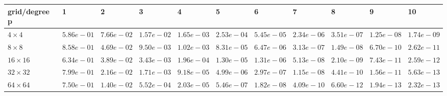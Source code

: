 \begin{tabular}{lllllllllll}
\hline
 grid/degree p   & 1          & 2          & 3          & 4          & 5          & 6          & 7          & 8          & 9          & 10         \\
\hline
 $4 \times 4$    & $5.86e-01$ & $7.66e-02$ & $1.57e-02$ & $1.65e-03$ & $2.53e-04$ & $5.45e-05$ & $2.34e-06$ & $3.51e-07$ & $1.25e-08$ & $1.74e-09$ \\
 $8 \times 8$    & $8.58e-01$ & $4.69e-02$ & $9.50e-03$ & $1.02e-03$ & $8.31e-05$ & $6.47e-06$ & $3.13e-07$ & $1.49e-08$ & $6.70e-10$ & $2.62e-11$ \\
 $16 \times 16$  & $6.34e-01$ & $3.89e-02$ & $3.43e-03$ & $1.96e-04$ & $1.30e-05$ & $1.31e-06$ & $5.13e-08$ & $2.10e-09$ & $7.43e-11$ & $2.59e-12$ \\
 $32 \times 32$  & $7.99e-01$ & $2.16e-02$ & $1.71e-03$ & $9.18e-05$ & $4.99e-06$ & $2.97e-07$ & $1.15e-08$ & $4.41e-10$ & $1.56e-11$ & $5.63e-13$ \\
 $64 \times 64$  & $7.50e-01$ & $1.40e-02$ & $5.52e-04$ & $2.03e-05$ & $5.46e-07$ & $1.82e-08$ & $4.09e-10$ & $6.60e-12$ & $1.94e-13$ & $2.32e-13$ \\
\hline
\end{tabular}